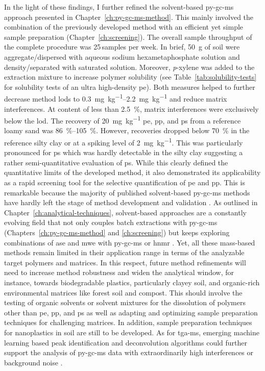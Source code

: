 In the light of these findings, I further refined the solvent-based \ac{py-gc-ms} approach presented in Chapter~\ref{ch:py-gc-ms-method}. This mainly involved the combination of the previously developed method with an efficient yet simple sample preparation (Chapter~\ref{ch:screening}). The overall sample throughput of the complete procedure was \num{25}\,samples per week.
In brief, \SI{50}{\gram} of soil were aggregate\-/dispersed with aqueous sodium hexametaphosphate solution and density\-/separated with saturated  solution. Moreover, \textit{p}-xylene was added to the extraction mixture to increase polymer solubility (see Table~\ref{tab:solubility-tests} for solubility tests of an ultra high-density \ac{pe}). Both measures helped to further decrease method \acp{lod} to \SIrange{0.3}{2.2}{\milli\gram\per\kilo\gram} and reduce matrix interferences. At  content of less than \SI{2.5}{\percent}, matrix interferences were exclusively below the \ac{lod}. The recovery of \SI{20}{\milli\gram\per\kilo\gram} \ac{pe}, \ac{pp}, and \ac{ps} from a reference loamy sand was \SIrange{86}{105}{\percent}. However, recoveries dropped below \SI{70}{\percent} in the reference silty clay or at a spiking level of \SI{2}{\milli\gram\per\kilo\gram}. This was particularly pronounced for \ac{ps} which was hardly detectable in the silty clay suggesting a rather semi-quantitative evaluation of \ac{ps}.
While this clearly defined the quantitative limits of the developed method, it also demonstrated its applicability as a rapid screening tool for the selective quantification of \ac{pe} and \ac{pp}. This is remarkable because the majority of published solvent-based \ac{py-gc-ms} methods have hardly left the stage of method development and validation \citep{DierkesQuantification2019,OkoffoIdentification2020}. As outlined in Chapter~\ref{ch:analytical-techniques}, solvent-based approaches are a constantly evolving field that not only couples batch extractions with \ac{py-gc-ms} (Chapters~\ref{ch:py-gc-ms-method} and \ref{ch:screening}) but keeps exploring combinations of \ac{ase} and \ac{mwe} with \ac{py-gc-ms} or \ac{hnmr} \citep{OkoffoIdentification2020,HermabessiereMicrowaveAssisted2021,NelsonQuantification2019,PeezQuantitative2020}.
Yet, all these mass-based methods remain limited in their application range in terms of the analyzable target polymers and matrices. In this respect, future method refinements will need to increase method robustness and widen the analytical window, for instance, towards biodegradable plastics, particularly clayey soil, and organic-rich environmental matrices like forest soil and compost. This should involve the testing of organic solvents or solvent mixtures for the dissolution of polymers other than \ac{pe}, \ac{pp}, and \ac{ps} as well as adapting and optimizing sample preparation techniques for challenging matrices. In addition, sample preparation techniques for nanoplastics in soil are still to be developed. As for \ac{tga-ms}, emerging machine learning based peak identification and deconvolution algorithms could further support the analysis of \ac{py-gc-ms} data with extraordinarily high interferences or background noise \citep{CowgerCritical2020,MatsuiIdentification2020}.
